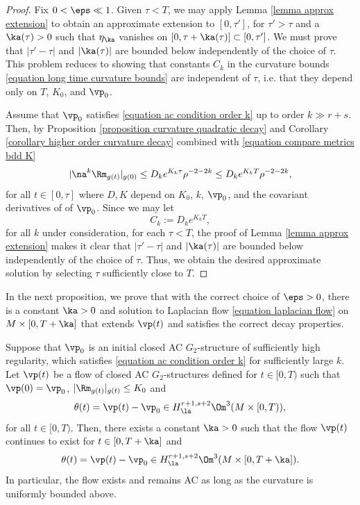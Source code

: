 \documentclass[hidelinks, 12pt, oneside, reqno]{amsart}
\begin{document}
\begin{proof}
    Fix $0 < \eps \ll 1$. Given $\tau < T$, we may apply Lemma \ref{lemma approx extension} to obtain an approximate extension to $[0, \tau']$, for $\tau' > \tau$ and a $\ka(\tau) > 0$ such that $\eta_{\ka}$ vanishes on $[0, \tau + \ka(\tau)] \subset [0, \tau']$. We must prove that $|\tau'-\tau|$ and $|\ka (\tau)|$ are bounded below independently of the choice of $\tau$. This problem reduces to showing that constants $C_k$ in the curvature bounds \eqref{equation long time curvature bounds} are independent of $\tau$, i.e. that they depend only on $T$, $K_0$, and $\vp_0$.

    Assume that $\vp_0$ satisfies \eqref{equation ac condition order k} up to order $k \gg r+ s$. Then, by Proposition \ref{proposition curvature quadratic decay} and Corollary \ref{corollary higher order curvature decay} combined with \eqref{equation compare metrics bdd K}
    \[
    |\na^k \Rm_{g(t)}|_{g(0)} \le D_ke^{K_k\tau} \rho^{-2-2k} \le D_ke^{K_kT} \rho^{-2-2k},
    \]
    for all $t \in [0,\tau]$ where $D,K$ depend on $K_0$, $k$, $\vp_0$, and the covariant derivatives of of $\vp_0$. Since we may let 
    \begin{equation}\label{equation extension curvature norms}
    C_k := D_ke^{K_kT},
    \end{equation}
    for all $k$ under consideration, for each $\tau < T$, the proof of Lemma \ref{lemma approx extension} makes it clear that $|\tau'-\tau|$ and $|\ka (\tau)|$ are bounded below independently of the choice of $\tau$. Thus, we obtain the desired approximate solution by selecting $\tau$ sufficiently close to $T$. 
\end{proof}

In the next proposition, we prove that with the correct choice of $\eps > 0$, there is a constant $\ka > 0$ and solution to Laplacian flow \ref{equation laplacian flow} on $M \times [0, T + \ka]$ that extends $\vp(t)$ and satisfies the correct decay properties. 

\begin{prop}\label{proposition preservation of AC}
Suppose that $\vp_0$ is an initial closed AC $G_2$-structure of sufficiently high regularity, which satisfies \eqref{equation ac condition order k} for sufficiently large $k$. Let $\vp(t)$ be a flow of closed AC $G_2$-structures defined for $t \in [0, T)$ such that $\vp(0) = \vp_0$, $|\Rm_{g(t)}|_{g(t)} \le K_0$ and 
\[
\theta(t) = \vp(t) - \vp_0 \in H^{r+1, s+2}_{\la} \Om^3(M \times [0,T)),
\]
for all $t \in [0,T)$. Then, there exists a constant $\ka > 0$ such that the flow $\vp(t)$ continues to exist for $t \in [0, T + \ka]$ and 
\[
\theta(t) = \vp(t) - \vp_0 \in H^{r+1, s+2}_{\la} \Om^3(M \times [0,T + \ka]).
\]
In particular, the flow exists and remains AC as long as the curvature is uniformly bounded above.
\end{prop}
\end{document}
